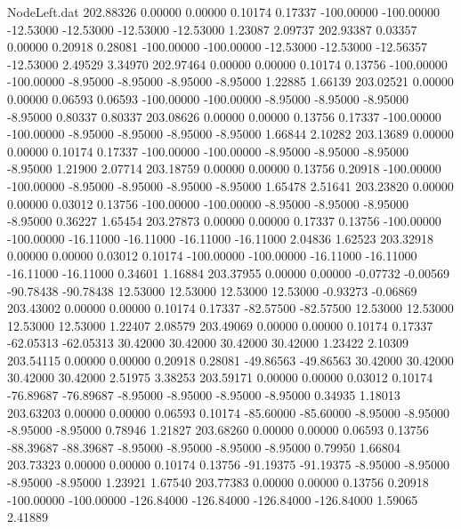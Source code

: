 \begin{filecontents}{NodeLeft.dat}
 202.88326    0.00000    0.00000     0.10174    0.17337 -100.00000 -100.00000  -12.53000  -12.53000  -12.53000  -12.53000    1.23087    2.09737
 202.93387    0.03357    0.00000     0.20918    0.28081 -100.00000 -100.00000  -12.53000  -12.53000  -12.56357  -12.53000    2.49529    3.34970
 202.97464    0.00000    0.00000     0.10174    0.13756 -100.00000 -100.00000   -8.95000   -8.95000   -8.95000   -8.95000    1.22885    1.66139
 203.02521    0.00000    0.00000     0.06593    0.06593 -100.00000 -100.00000   -8.95000   -8.95000   -8.95000   -8.95000    0.80337    0.80337
 203.08626    0.00000    0.00000     0.13756    0.17337 -100.00000 -100.00000   -8.95000   -8.95000   -8.95000   -8.95000    1.66844    2.10282
 203.13689    0.00000    0.00000     0.10174    0.17337 -100.00000 -100.00000   -8.95000   -8.95000   -8.95000   -8.95000    1.21900    2.07714
 203.18759    0.00000    0.00000     0.13756    0.20918 -100.00000 -100.00000   -8.95000   -8.95000   -8.95000   -8.95000    1.65478    2.51641
 203.23820    0.00000    0.00000     0.03012    0.13756 -100.00000 -100.00000   -8.95000   -8.95000   -8.95000   -8.95000    0.36227    1.65454
 203.27873    0.00000    0.00000     0.17337    0.13756 -100.00000 -100.00000  -16.11000  -16.11000  -16.11000  -16.11000    2.04836    1.62523
 203.32918    0.00000    0.00000     0.03012    0.10174 -100.00000 -100.00000  -16.11000  -16.11000  -16.11000  -16.11000    0.34601    1.16884
 203.37955    0.00000    0.00000    -0.07732   -0.00569  -90.78438  -90.78438   12.53000   12.53000   12.53000   12.53000   -0.93273   -0.06869
 203.43002    0.00000    0.00000     0.10174    0.17337  -82.57500  -82.57500   12.53000   12.53000   12.53000   12.53000    1.22407    2.08579
 203.49069    0.00000    0.00000     0.10174    0.17337  -62.05313  -62.05313   30.42000   30.42000   30.42000   30.42000    1.23422    2.10309
 203.54115    0.00000    0.00000     0.20918    0.28081  -49.86563  -49.86563   30.42000   30.42000   30.42000   30.42000    2.51975    3.38253
 203.59171    0.00000    0.00000     0.03012    0.10174  -76.89687  -76.89687   -8.95000   -8.95000   -8.95000   -8.95000    0.34935    1.18013
 203.63203    0.00000    0.00000     0.06593    0.10174  -85.60000  -85.60000   -8.95000   -8.95000   -8.95000   -8.95000    0.78946    1.21827
 203.68260    0.00000    0.00000     0.06593    0.13756  -88.39687  -88.39687   -8.95000   -8.95000   -8.95000   -8.95000    0.79950    1.66804
 203.73323    0.00000    0.00000     0.10174    0.13756  -91.19375  -91.19375   -8.95000   -8.95000   -8.95000   -8.95000    1.23921    1.67540
 203.77383    0.00000    0.00000     0.13756    0.20918 -100.00000 -100.00000 -126.84000 -126.84000 -126.84000 -126.84000    1.59065    2.41889

\end{filecontents}
